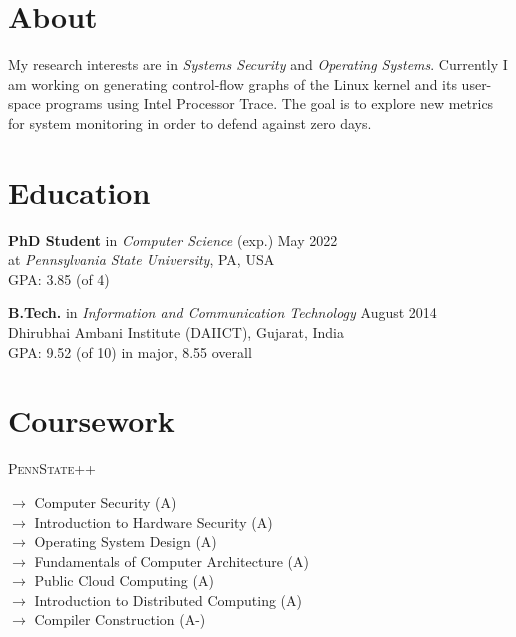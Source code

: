\documentclass[margin]{res}
\newcommand{\daiict}{\textsc{DAIICT}}
\newcommand{\psu}{\textsc{PennState}}
\begin{document}
\begin{resume}

\section{About}
My research interests are in \emph{Systems Security} and \emph{Operating Systems}.
Currently I am working on generating control-flow graphs of the Linux kernel and its 
user-space programs using Intel\textsuperscript{\textregistered} Processor Trace.
The goal is to explore new metrics for system monitoring in order to defend against zero days.

\section{Education}

\textbf{PhD Student} in \emph{Computer Science} \hfill (exp.) May 2022\\
at \emph{Pennsylvania State University}, PA, USA\\
GPA: 3.85 (of 4)

\textbf{B.Tech.} in \emph{Information and Communication Technology} \hfill August 2014\\
Dhirubhai Ambani Institute (\daiict), Gujarat, India\\
GPA: 9.52 (of 10) in major,
8.55 overall 

\section{Coursework}

\begin{labeling}{\psu++}

\item[{\bfseries\psu}]
	$\longrightarrow$ Computer Security (A)\\
	$\longrightarrow$ Introduction to Hardware Security (A)\\
	$\longrightarrow$ Operating System Design (A)\\
	$\longrightarrow$ Fundamentals of Computer Architecture (A)\\
	$\longrightarrow$ Public Cloud Computing (A)\\
	$\longrightarrow$ Introduction to Distributed Computing (A)\\
	$\longrightarrow$ Compiler Construction (A-)\\[2ex]


\end{labeling}
\end{resume}
\end{document}
